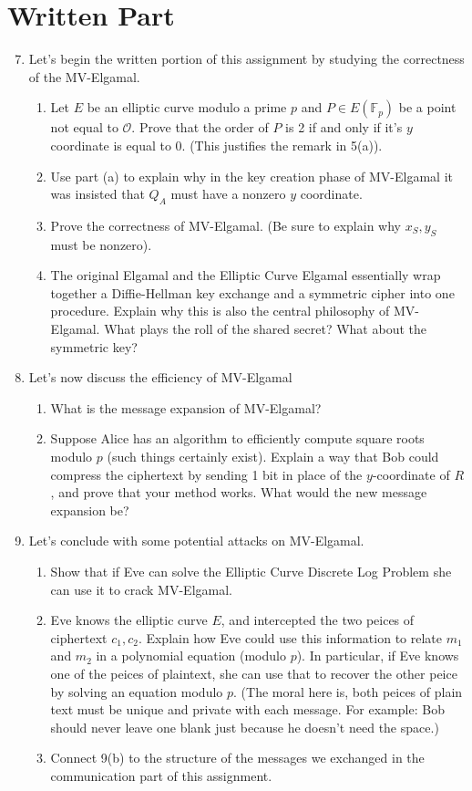 \documentclass[11pt]{article}
\newcommand{\bF}{\mathbb{F}}
\newcommand{\cO}{\mathcal{O}}
\begin{document}
\section*{Written Part}
\begin{enumerate}
  \setcounter{enumi}{6}
  \item{Let's begin the written portion of this assignment by studying the correctness of the MV-Elgamal.
  \begin{enumerate}
    \item{
    Let $E$ be an elliptic curve modulo a prime $p$ and $P\in E(\bF_p)$ be a point not equal to $\cO$.  Prove that the order of $P$ is 2 if and only if it's $y$ coordinate is equal to 0.  (This justifies the remark in 5(a)).
    }
    \item{
    Use part (a) to explain why in the key creation phase of MV-Elgamal it was insisted that $Q_A$ must have a nonzero $y$ coordinate.
    }
    \item{
    Prove the correctness of MV-Elgamal.  (Be sure to explain why $x_S,y_S$ must be nonzero).
    }
    \item{
    The original Elgamal and the Elliptic Curve Elgamal essentially wrap together a Diffie-Hellman key exchange and a symmetric cipher into one procedure.  Explain why this is also the central philosophy of MV-Elgamal.  What plays the roll of the shared secret?  What about the symmetric key?
    }
  \end{enumerate}
  }
  \item{Let's now discuss the efficiency of MV-Elgamal
  \begin{enumerate}
    \item{
    What is the message expansion of MV-Elgamal?
    }
    \item{
    Suppose Alice has an algorithm to efficiently compute square roots modulo $p$ (such things certainly exist).  Explain a way that Bob could compress the ciphertext by sending 1 bit in place of the $y$-coordinate of $R$, and prove that your method works.  What would the new message expansion be?
    }
  \end{enumerate}
  }
  \item{
  Let's conclude with some potential attacks on MV-Elgamal.
  \begin{enumerate}
    \item{
    Show that if Eve can solve the Elliptic Curve Discrete Log Problem she can use it to crack MV-Elgamal.
    }
    \item{
    Eve knows the elliptic curve $E$, and intercepted the two peices of ciphertext $c_1,c_2$.  Explain how Eve could use this information to relate $m_1$ and $m_2$ in a polynomial equation (modulo $p$).  In particular, if Eve knows one of the peices of plaintext, she can use that to recover the other peice by solving an equation modulo $p$.  (The moral here is, both peices of plain text must be unique and private with each message.  For example: Bob should never leave one blank just because he doesn't need the space.)
    }
    \item{
    Connect 9(b) to the structure of the messages we exchanged in the communication part of this assignment.
    }
  \end{enumerate}
  }
\end{enumerate}
\end{document}
